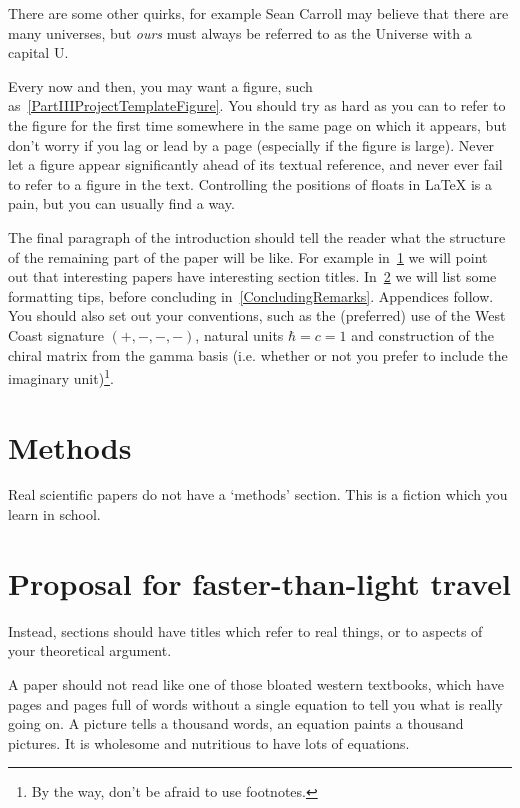 \documentclass[aps,prd,reprint,preprintnumbers,showpacs,floatfix,nofootinbib,superscript address]{revtex4-2}
\begin{document}
There are some other quirks, for example Sean Carroll may believe that there are many universes, but \emph{ours} must always be referred to as the Universe with a capital U.

Every now and then, you may want a figure, such as~\cref{PartIIIProjectTemplateFigure}. You should try as hard as you can to refer to the figure for the first time somewhere in the same page on which it appears, but don't worry if you lag or lead by a page (especially if the figure is large). Never let a figure appear significantly ahead of its textual reference, and never ever fail to refer to a figure in the text. Controlling the positions of floats in \LaTeX{} is a pain, but you can usually find a way.

The final paragraph of the introduction should tell the reader what the structure of the remaining part of the paper will be like. For example in~\cref{Methods} we will point out that interesting papers have interesting section titles. In~\cref{FTL} we will list some formatting tips, before concluding in~\cref{ConcludingRemarks}. Appendices follow. You should also set out your conventions, such as the (preferred) use of the West Coast signature $(+,-,-,-)$, natural units $\hbar=c=1$ and construction of the chiral matrix from the gamma basis (i.e. whether or not you prefer to include the imaginary unit)\footnote{By the way, don't be afraid to use footnotes.}.

\section{Methods}\label{Methods}

Real scientific papers do not have a `methods' section. This is a fiction which you learn in school.

\section{Proposal for faster-than-light travel}\label{FTL}

Instead, sections should have titles which refer to real things, or to aspects of your theoretical argument.

A paper should not read like one of those bloated western textbooks, which have pages and pages full of words without a single equation to tell you what is really going on. A picture tells a thousand words, an equation paints a thousand pictures. It is wholesome and nutritious to have lots of equations.
\end{document}
